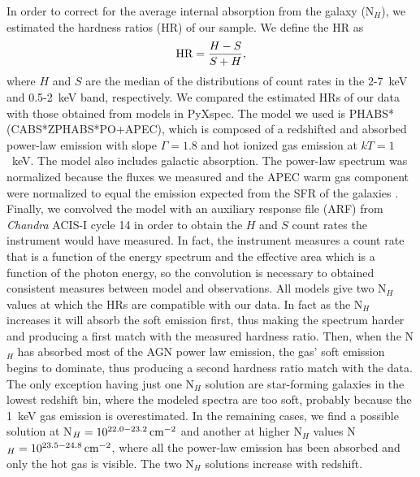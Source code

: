 
In order to correct for the average internal absorption from the galaxy (N$_H$), we estimated the hardness ratios (HR) of our sample. We define the HR as
\begin{equation}  \label{eq:HR}
\centering
\text{HR}=\frac{H-S}{S+H},
\end{equation}
where $H$ and $S$ are the median of the distributions of count rates in the 2-7~keV and 0.5-2~keV band, respectively. 
We compared the estimated HRs of our data with those obtained from models in PyXspec. The model we used is PHABS*(CABS*ZPHABS*PO+APEC), which is composed of a redshifted and absorbed power-law emission with slope $\Gamma=1.8$ and hot ionized gas emission at $kT=1$~keV. The model also includes galactic absorption. The power-law spectrum was normalized because the fluxes we measured and the APEC warm gas component were normalized to equal the emission expected from the SFR of the galaxies \citep[][Eq.~1]{2012MNRAS.426.1870M}. Finally, we convolved the model with an auxiliary response file (ARF) from \textit{Chandra} ACIS-I cycle 14 in order to obtain the $H$ and $S$ count rates the instrument would have measured. In fact, the instrument measures a count rate that is a function of the energy spectrum and the effective area which is a function of the photon energy, so the convolution is necessary to obtained consistent measures between model and observations. All models give two N$_H$ values at which the HRs are compatible with our data. In fact as the N$_H$ increases it will absorb the soft emission first, thus making the spectrum harder and producing a first match with the measured hardness ratio. Then, when the N$_H$ has absorbed most of the AGN power law emission, the gas' soft emission begins to dominate, thus producing a second hardness ratio match with the data. The only exception having just one N$_H$ solution are star-forming galaxies in the lowest redshift bin, where the modeled spectra are too soft, probably because the 1~keV gas emission is overestimated. In the remaining cases, we find a possible solution at N$_H = 10^{22.0-23.2}\,\mathrm{cm}^{-2}$ and another at higher N$_H$ values N$_H = 10^{23.5-24.8}\,\mathrm{cm}^{-2}$, where all the power-law emission has been absorbed and only the hot gas is visible. The two N$_H$ solutions increase with redshift.
